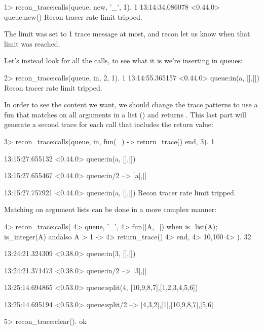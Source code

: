 \documentclass[11pt, oneside]{book}   	%
\begin{document}
\begin{VerbatimEshell}
1> recon_trace:calls({queue, new, '_'}, 1).
1
13:14:34.086078 <0.44.0> queue:new()
Recon tracer rate limit tripped.
\end{VerbatimEshell}

The limit was set to 1 trace message at most, and recon let us know when that limit was reached.

Let's instead look for all the  calls, to see what it is we're inserting in queues:

\begin{VerbatimEshell}
2> recon_trace:calls({queue, in, 2}, 1).
1
13:14:55.365157 <0.44.0> queue:in(a, {[],[]})
Recon tracer rate limit tripped.
\end{VerbatimEshell}

In order to see the content we want, we should change the trace patterns to use a fun that matches on all arguments in a list (\term{\_}) and returns . This last part will generate a second trace for each call that includes the return value:

\begin{VerbatimEshell}
3> recon_trace:calls({queue, in, fun(_) -> return_trace() end}, 3).
1

13:15:27.655132 <0.44.0> queue:in(a, {[],[]})

13:15:27.655467 <0.44.0> queue:in/2 --> {[a],[]}

13:15:27.757921 <0.44.0> queue:in(a, {[],[]})
Recon tracer rate limit tripped.
\end{VerbatimEshell}

Matching on argument lists can be done in a more complex manner:

\begin{VerbatimEshell}
4> recon_trace:calls(
4>   {queue, '_',
4>    fun([A,_]) when is_list(A); is_integer(A) andalso A > 1 ->
4>        return_trace()
4>    end},
4>   {10,100}
4> ).
32

13:24:21.324309 <0.38.0> queue:in(3, {[],[]})

13:24:21.371473 <0.38.0> queue:in/2 --> {[3],[]}

13:25:14.694865 <0.53.0> queue:split(4, {[10,9,8,7],[1,2,3,4,5,6]})

13:25:14.695194 <0.53.0> queue:split/2 --> {{[4,3,2],[1]},{[10,9,8,7],[5,6]}}

5> recon_trace:clear().
ok
\end{VerbatimEshell}
\end{document}
